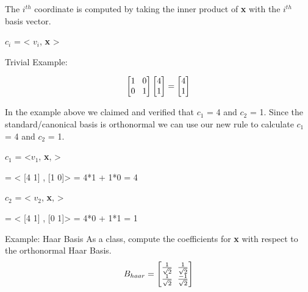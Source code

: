 \documentclass[11pt]{article}
\begin{document}
The $i^{th}$ coordinate is computed by taking the inner product of \textbf{x} with the $i^{th}$ basis vector.\newline
\begin{center}

$c_i$ = < $v_i$, \textbf{x} >

\end{center}

Trivial Example:

\[
\begin{bmatrix}
   1 \hspace{3mm} 0       \\
   0 \hspace{3mm} 1            
\end{bmatrix}
\begin{bmatrix}
    4 \\
    1
\end{bmatrix}
= 
\begin{bmatrix}
    4  \\
    1
\end{bmatrix}
\]

In the example above we claimed and verified that $c_1$ = 4 and $c_2$ = 1. Since the standard/canonical basis is orthonormal we can use our new rule to calculate $c_1$ = 4 and $c_2$ = 1.\newline

\begin{center}
$c_1$ = <$v_1$, \textbf{x}, >
\end{center}
\begin{center}
= < [4 1] , [1 0]> = 4*1 + 1*0 = 4
\end{center}

\begin{center}
$c_2$ = < $v_2$, \textbf{x}, >
\end{center}
\begin{center}
= < [4 1] , [0 1]> = 4*0 + 1*1 = 1
\end{center}

\vspace{3mm}

Example: Haar Basis\newline
As a class, compute the coefficients for \textbf{x} with respect to the orthonormal Haar Basis.\newline
\[
B_{haar} = 
\begin{bmatrix}
  \frac{1}{\sqrt{2}} \hspace{2mm} \frac{1}{\sqrt{2}} \\
  \frac{1}{\sqrt{2}} \hspace{2mm} \frac{-1}{\sqrt{2}}       
\end{bmatrix}
\]
\end{document}
